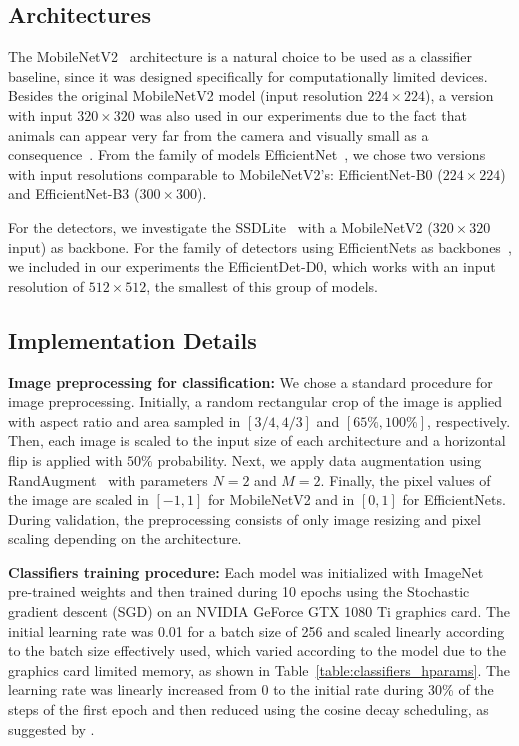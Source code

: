 \subsection{Architectures}

The MobileNetV2~\citep{sandler2018mobilenetv2} architecture is a natural choice
to be used as a classifier baseline, since it was designed specifically for
computationally limited devices. Besides the original MobileNetV2 model (input
resolution $224 \times 224$), a version with input $320 \times 320$ was also
used in our experiments due to the fact that animals can appear very far from
the camera and visually small as a
consequence~\citep{norouzzadeh2018automatically}. From the family of models EfficientNet~\citep{tan2019efficientnet}, we chose two
versions with input resolutions comparable to MobileNetV2's: EfficientNet-B0
($224 \times 224$) and EfficientNet-B3 ($300 \times 300$).

For the detectors, we investigate the SSDLite~\citep{sandler2018mobilenetv2}
with a MobileNetV2 ($320 \times 320$ input) as backbone. For the family of
detectors using EfficientNets as backbones~\citep{tan2020efficientdet}, we
included in our experiments the EfficientDet-D0, which works with an input
resolution of $512 \times 512$, the smallest of this group of models.

\subsection{Implementation Details}

\textbf{Image preprocessing for classification:} We chose a standard procedure
for image preprocessing. Initially, a random rectangular crop of the image is
applied with aspect ratio and area sampled in $[3/4, 4/3]$ and $[65\%, 100\%]$,
respectively. Then, each image is scaled to the input size of each architecture
and a horizontal flip is applied with $50\%$ probability. Next, we apply data
augmentation using RandAugment~\citep{cubuk2020randaugment} with parameters
$N=2$ and $M=2$. Finally, the pixel values of the image are scaled in $[-1, 1]$
for MobileNetV2 and in $[0, 1]$ for EfficientNets. During validation, the
preprocessing consists of only image resizing and pixel scaling depending on
the architecture.

\textbf{Classifiers training procedure:} Each model was initialized with
ImageNet pre-trained weights and then trained during 10 epochs using the
Stochastic gradient descent (SGD) on an NVIDIA GeForce GTX 1080 Ti graphics
card. The initial learning rate was 0.01 for a batch size of 256 and scaled
linearly according to the batch size effectively used, which varied according
to the model due to the graphics card limited memory, as shown in
Table~\ref{table:classifiers_hparams}. The learning rate was linearly increased
from 0 to the initial rate during 30\% of the steps of the first epoch and then
reduced using the cosine decay scheduling, as suggested by \citet{he2019bag}.

